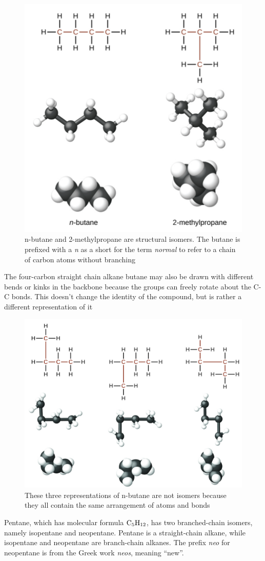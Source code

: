 \begin{figure}[ht!]
    \centering
    \includegraphics[width=0.5 \textwidth]{../figures/n-butane-2-methylpropane.png}
    \caption{n-butane and 2-methylpropane are structural isomers. The butane is prefixed with a
    \textit{n} as a short for the term \textit{normal} to refer to a chain of carbon atoms without
    branching}
\end{figure}

The four-carbon straight chain alkane butane may also be drawn with different bends or kinks in the
backbone because the groups can freely rotate about the C-C bonds. This doesn't change the identity
of the compound, but is rather a different representation of it

\begin{figure}[ht!]
    \centering
    \includegraphics[width=0.6 \textwidth]{../figures/n-butane-backbones.png}
    \caption{These three representations of n-butane are not isomers because they all contain
    the same arrangement of atoms and bonds}
\end{figure}

Pentane, which has molecular formula $\ch{C5H12}$, has two branched-chain isomers, namely
isopentane and neopentane. Pentane is a straight-chain alkane, while isopentane and neopentane are
branch-chain alkanes. The prefix \textit{neo} for neopentane is from the Greek work \textit{neos},
meaning ``new''.

